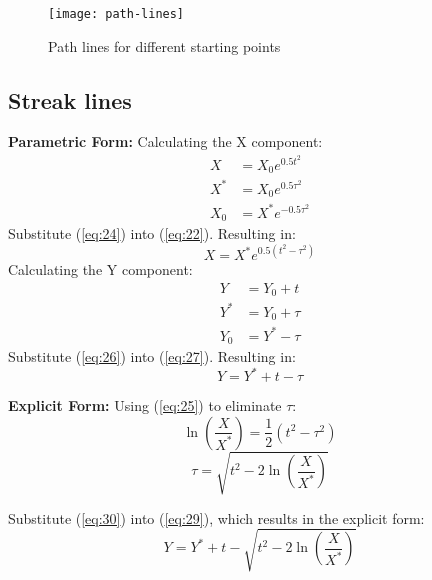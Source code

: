 \documentclass[../main.tex]{subfiles}
\begin{document}
	\begin{figure}[ht]
		\centering
		\texttt{[image: path-lines]}

		\label{fig:pathline}
		\caption{Path lines for different starting points}
	\end{figure}
	\subsection{Streak lines}
	\textbf{Parametric Form:}
	Calculating the X component:
	\begin{align}
		\label{eq:22}
		X &= X_0 e^{0.5 t^2} \\
		X^{*} &= X_0 e^{0.5 \tau ^2} \\
		\label{eq:24}
		X_0 &= X^{*} e^{-0.5 \tau ^2}
	\end{align}
	Substitute (\ref{eq:24}) into (\ref{eq:22}). Resulting in:
	\begin{equation}
		\label{eq:25}
		X = X^{*} e^{0.5(t^2 - \tau ^2)}
	\end{equation}
	Calculating the Y component:
	\begin{align}
		\label{eq:26}
		Y &= Y_0 + t \\
		Y^{*} &= Y_0 + \tau \\
		\label{eq:27}
		Y_0 &= Y^{*} - \tau
	\end{align}
	Substitute (\ref{eq:26}) into (\ref{eq:27}). Resulting in:
	\begin{equation}
		\label{eq:29}
		Y = Y^{*} + t - \tau
	\end{equation}

	\textbf{Explicit Form:}
	Using  (\ref{eq:25}) to eliminate $\tau$:
		\begin{equation*}
		\ln(\frac{X}{X^*}) = \frac{1}{2} (t^2 - \tau ^2)
		\end{equation*}
		\begin{equation}
			\label{eq:30}
			\tau = \sqrt{t^2 - 2 \ln(\frac{X}{X^*})}
		\end{equation}

		Substitute (\ref{eq:30}) into (\ref{eq:29}), which results in the explicit form:
		\begin{equation}
			Y = Y^{*} + t - \sqrt{t^2 - 2 \ln(\frac{X}{X^*})}
		\end{equation}
\end{document}
